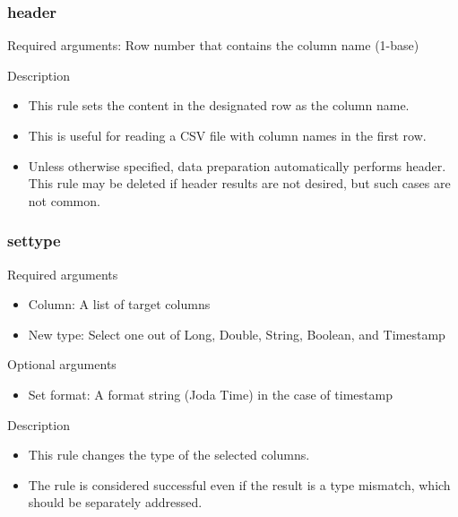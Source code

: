 \documentclass[letterpaper,10pt,english]{sphinxmanual}
\begin{document}
\subsubsection{header}
\label{\detokenize{discovery/part07/rule_kinds:header}}
Required arguments: Row number that contains the column name (1-base)

Description
\begin{itemize}
\item {} 
This rule sets the content in the designated row as the column name.

\item {} 
This is useful for reading a CSV file with column names in the first row.

\item {} 
Unless otherwise specified, data preparation automatically performs header. This rule may be deleted if header results are not desired, but such cases are not common.

\end{itemize}


\subsubsection{settype}
\label{\detokenize{discovery/part07/rule_kinds:settype}}
Required arguments
\begin{itemize}
\item {} 
Column: A list of target columns

\item {} 
New type: Select one out of Long, Double, String, Boolean, and Timestamp

\end{itemize}

Optional arguments
\begin{itemize}
\item {} 
Set format: A format string (Joda Time) in the case of timestamp

\end{itemize}

Description
\begin{itemize}
\item {} 
This rule changes the type of the selected columns.

\item {} 
The rule is considered successful even if the result is a type mismatch, which should be separately addressed.

\end{itemize}
\end{document}
